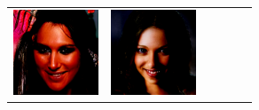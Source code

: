\documentclass{article}
\newcommand{\pganw}{1.0in}
\begin{document}
\begin{table}[htbp]
\begin{center}
\begin{tabular}{cc|cc|cc}
\includegraphics[width=\pganw]{figures/pgan/2_base_raw_base.png} &
\includegraphics[width=\pganw]{figures/pgan/3_base_raw_base.png} &

\end{tabular}
\end{center}
\end{table}
\end{document}
